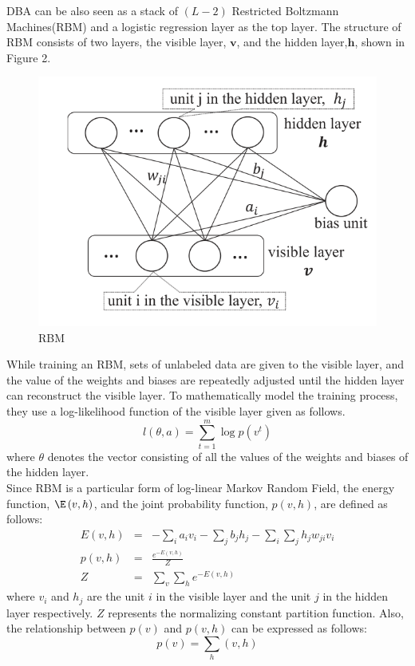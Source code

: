 \documentclass[11pt]{report}
\newcommand{\mb}{\mathbf}
\begin{document}
	DBA can be also seen as a stack of $\left(L-2\right)$ Restricted Boltzmann Machines(RBM) and a logistic regression layer as the top layer. The structure of RBM consists of two layers, the visible layer, $\mb{v}$, and the hidden layer,$\mb{h}$, shown in Figure 2.
	\begin{figure}[h!]
		\centering
		\includegraphics[width=0.5\linewidth]{figure2.png}
		\caption{RBM}
		\label{fig-label}
	\end{figure}
	While training an RBM, sets of unlabeled data are given to the visible layer, and the value of the weights and biases are repeatedly adjusted until the hidden layer can reconstruct the visible layer. To mathematically model the training process, they use a log-likelihood function of the visible layer given as follows.
	\begin{equation}
	l\left(\theta,a\right)=\sum_{t=1}^{m}\log{p\left(v^t\right)}
	\end{equation}
	where $\theta$ denotes the vector consisting of all the values of the weights and biases of the hidden layer.\\
	Since RBM is a particular form of log-linear Markov Random Field, the energy function, $\E\left(v,h\right)$, and the joint probability function, $p\left(v,h\right)$, are defined as follows:\\
	\begin{eqnarray}
	E\left(v,h\right) &=& -\sum_{i}a_iv_i-\sum_{j}b_jh_j-\sum_{i}\sum_{j}h_jw_{ji}v_i\\
	p\left(v,h\right) &=& \frac{e^{-E\left(v,h\right)}}{Z}\\
	Z &=& \sum_{v}\sum_{h}e^{-E\left(v,h\right)}
	\end{eqnarray}
	where $v_i$ and $h_j$ are the unit $i$ in the visible layer and the unit $j$ in the hidden layer respectively. $Z$ represents the normalizing constant partition function. Also, the relationship between $p\left(v\right)$ and $p\left(v,h\right)$ can be expressed as follows:\\
	\begin{equation}
	p\left(v\right)=\sum_{h}\left(v,h\right)
	\end{equation}
\end{document}
